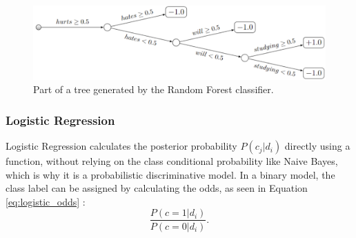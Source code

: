         \begin{figure}
        \centering

\includegraphics[scale=0.6]{Images/random_forest.png}
    \caption{Part of a tree generated by the Random Forest classifier.}
      \label{fig:tree}
\end{figure}
\subsubsection{Logistic Regression}
\label{sub:logistic}

Logistic Regression calculates the posterior probability $P(c_j|d_i)$ directly using a function, without relying on the class conditional probability like Naive Bayes, which is why it is a probabilistic discriminative model. In a binary model, the class label can be assigned by calculating the odds, as seen in Equation \eqref{eq:logistic_odds} \cite{DBLP:books/aw/TanSKK2019}:
        \begin{equation}
            \label{eq:logistic_odds}
                \frac{P(c=1|d_i)}{P(c=0|d_i)}.
        \end{equation}
        
